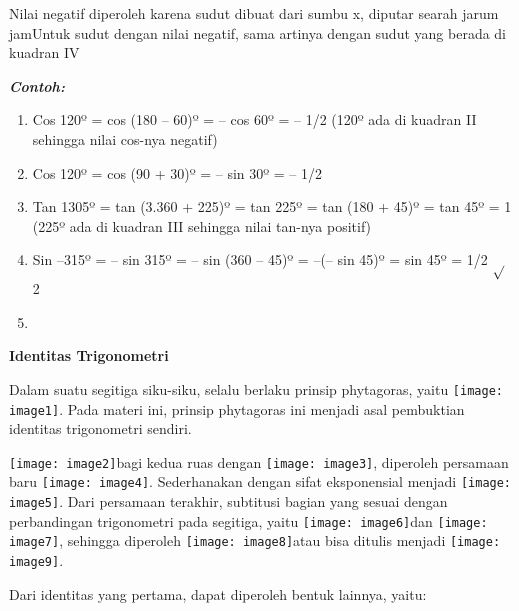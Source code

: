 \documentclass[11pt,fleqn]{book} %
\begin{document}
\begin{myEnumerate}
\begin{itemize}
  Nilai negatif diperoleh karena sudut dibuat dari sumbu x, diputar searah jarum jamUntuk sudut dengan nilai negatif, sama artinya dengan sudut yang berada di kuadran IV

\noindent \textbf{\textit{Contoh:}}

\begin{enumerate}
\item  Cos 120º = cos (180 -- 60)º = -- cos 60º = -- 1/2 (120º ada di kuadran II sehingga nilai cos-nya negatif)

\item  Cos 120º = cos (90 + 30)º = -- sin 30º = -- 1/2

\item  Tan 1305º = tan (3.360 + 225)º = tan 225º = tan (180 + 45)º = tan 45º = 1 (225º ada di kuadran III sehingga nilai tan-nya positif)

\item  Sin --315º = -- sin 315º = -- sin (360 -- 45)º = --(-- sin 45)º = sin 45º = 1/2 $\mathrm{\sqrt{}}$2

\item  
\end{enumerate}

\noindent \textbf{Identitas Trigonometri}

Dalam suatu segitiga siku-siku, selalu berlaku prinsip phytagoras, yaitu \texttt{[image: image1]}. Pada materi ini, prinsip phytagoras ini menjadi asal pembuktian identitas trigonometri sendiri.

\noindent \texttt{[image: image2]}bagi kedua ruas dengan \texttt{[image: image3]}, diperoleh persamaan baru \texttt{[image: image4]}. Sederhanakan dengan sifat eksponensial menjadi \texttt{[image: image5]}. Dari persamaan terakhir, subtitusi bagian yang sesuai dengan perbandingan trigonometri pada segitiga, yaitu \texttt{[image: image6]}dan \texttt{[image: image7]}, sehingga diperoleh \texttt{[image: image8]}atau bisa ditulis menjadi \texttt{[image: image9]}.

\noindent Dari identitas yang pertama, dapat diperoleh bentuk lainnya, yaitu:


\end{itemize}
\end{myEnumerate}
\end{document}
